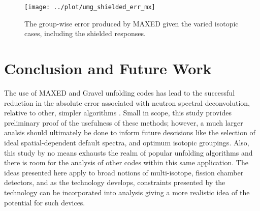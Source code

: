 \documentclass[journal]{IEEEtran}
\begin{document}
\begin{figure}[h!tb]
  \centering
  \texttt{[image: ../plot/umg\_shielded\_err\_mx]}
  \caption{The group-wise error produced by MAXED given the varied isotopic cases, including the shielded responses.}
  \label{fig:shielded_err_mx}
\end{figure}



\section{Conclusion and Future Work}

The use of MAXED and Gravel unfolding codes has lead to the successful reduction in the absolute error associated with neutron spectral deconvolution, relative to other, simpler algorithms \cite{roberts2018use}.
Small in scope, this study provides preliminary proof of the usefulness of these methods; however, a much larger analsis should ultimately be done to inform future descisions like the selection of ideal spatial-dependent default spectra, and optimum isotopic groupings.
Also, this study by no means exhausts the realm of popular unfolding algorithms and there is room for the analysis of other codes within this same application.
The ideas presented here apply to broad notions of multi-isotope, fission chamber detectors, and as the technology develops, constraints presented by the technology can be incorporated into analysis giving a more realistic idea of the potential for such devices.

 


\ifCLASSOPTIONcaptionsoff
  \newpage
\fi




\end{document}

